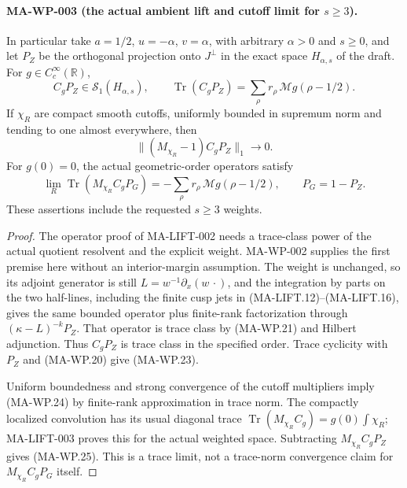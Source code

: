 \paragraph{MA-WP-003 (the actual ambient lift and cutoff limit for $s\ge3$).}
In particular take $a=1/2$, $u=-\alpha$, $v=\alpha$,
with arbitrary $\alpha>0$ and $s\ge0$, and let
$P_Z$ be the orthogonal projection onto $J^\perp$ in
the exact space $H_{\alpha,s}$ of the draft.
For $g\in C_c^\infty(\mathbb R)$,
\[
 C_gP_Z\in\mathcal S_1(H_{\alpha,s}),\qquad
 \operatorname{Tr}(C_gP_Z)
       =\sum_\rho r_\rho\,\mathcal Mg(\rho-1/2).
 \tag{MA-WP.23}
\]
If $\chi_R$ are compact smooth cutoffs, uniformly bounded
in supremum norm and tending to one almost everywhere,
then
\[
           \|(M_{\chi_R}-1)C_gP_Z\|_1\longrightarrow0.
 \tag{MA-WP.24}
\]
For $g(0)=0$, the actual geometric-order operators satisfy
\[
 \lim_R\operatorname{Tr}(M_{\chi_R}C_gP_G)
       =-\sum_\rho r_\rho\,\mathcal Mg(\rho-1/2),
 \qquad P_G=1-P_Z.
 \tag{MA-WP.25}
\]
These assertions include the requested $s\ge3$ weights.

\begin{proof}
The operator proof of MA-LIFT-002 needs a trace-class
power of the actual quotient resolvent and the explicit
weight. MA-WP-002 supplies the first premise here without
an interior-margin assumption. The weight is unchanged,
so its adjoint generator is still
$L=w^{-1}\partial_x(w\,\cdot)$, and the integration by
parts on the two half-lines, including the finite cusp
jets in (MA-LIFT.12)--(MA-LIFT.16), gives the same bounded
operator plus finite-rank factorization through
$(\kappa-L)^{-k}P_Z$. That operator is trace class by
(MA-WP.21) and Hilbert adjunction. Thus $C_gP_Z$ is trace
class in the specified order. Trace cyclicity with $P_Z$
and (MA-WP.20) give (MA-WP.23).

Uniform boundedness and strong convergence of the
cutoff multipliers imply (MA-WP.24) by finite-rank
approximation in trace norm. The compactly localized
convolution has its usual diagonal trace
$\operatorname{Tr}(M_{\chi_R}C_g)=g(0)\int\chi_R$;
MA-LIFT-003 proves this for the actual weighted space.
Subtracting $M_{\chi_R}C_gP_Z$ gives (MA-WP.25).
This is a trace limit, not a trace-norm convergence
claim for $M_{\chi_R}C_gP_G$ itself.
\end{proof}

